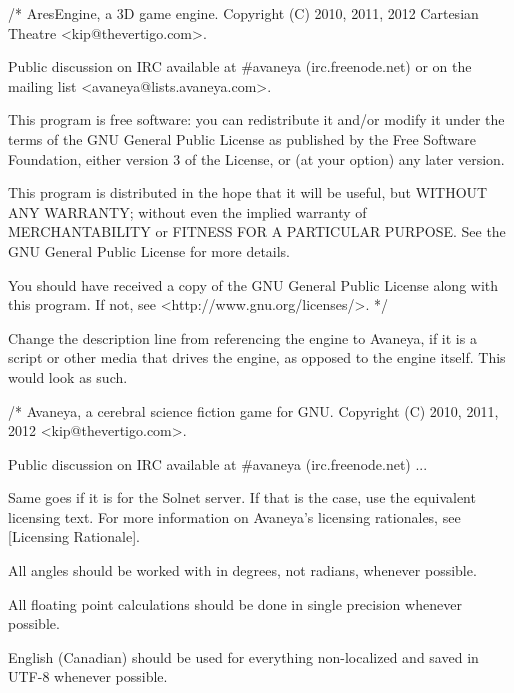 \startCodeExample
/*
    AresEngine, a 3D game engine.
    Copyright (C) 2010, 2011, 2012 Cartesian Theatre <kip@thevertigo.com>.

    Public discussion on IRC available at #avaneya (irc.freenode.net)
    or on the mailing list <avaneya@lists.avaneya.com>.

    This program is free software: you can redistribute it and/or modify
    it under the terms of the GNU General Public License as published by
    the Free Software Foundation, either version 3 of the License, or
    (at your option) any later version.

    This program is distributed in the hope that it will be useful,
    but WITHOUT ANY WARRANTY; without even the implied warranty of
    MERCHANTABILITY or FITNESS FOR A PARTICULAR PURPOSE.  See the
    GNU General Public License for more details.

    You should have received a copy of the GNU General Public License
    along with this program.  If not, see <http://www.gnu.org/licenses/>.
*/
\stopCodeExample

Change the description line from referencing the engine to Avaneya, if it is a script or other media that drives the engine, as opposed to the engine itself. This would look as such.

\startCodeExample
/*
    Avaneya, a cerebral science fiction game for GNU.
    Copyright (C) 2010, 2011, 2012 <kip@thevertigo.com>.

    Public discussion on IRC available at #avaneya (irc.freenode.net)
    ...
\stopCodeExample

Same goes if it is for the Solnet server. If that is the case, use the equivalent licensing text. For more information on Avaneya's licensing rationales, see [Licensing Rationale].


\startitemize[4]
\item
All angles should be worked with in degrees, not radians, whenever possible.

\item
All floating point calculations should be done in single precision whenever possible.
\stopitemize


\startitemize[4]
\item
English (Canadian) should be used for everything non-localized and saved in UTF-8 whenever possible.

